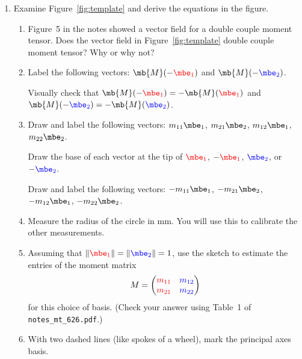 \documentclass[11pt,titlepage,fleqn]{article}
\newcommand{\mtfile}{\texttt{notes\_mt\_626.pdf}}
\newcommand{\eone}{\textcolor{red}{\mbe_1}}
\newcommand{\etwo}{\textcolor{blue}{\mbe_2}}
\begin{document}
\begin{enumerate}

\item Examine Figure~\ref{fig:template} and derive the equations in the figure.
\label{prob:bigvec}

\begin{enumerate}
\item Figure~5 in the notes showed a vector field for a double couple moment tensor. Does the vector field in Figure~\ref{fig:template} double couple moment tensor? Why or why not?

\item Label the following vectors: $\mb{M}(-\eone)$ and $\mb{M}(-\etwo)$.

Visually check that $\mb{M}(-\eone) = -\mb{M}(\eone)$ and $\mb{M}(-\etwo) = -\mb{M}(\etwo)$.

\item Draw and label the following vectors: \textcolor{red}{$m_{11}\mbe_1$}, \textcolor{red}{$m_{21}\mbe_2$}, \textcolor{blue}{$m_{12}\mbe_1$}, \textcolor{blue}{$m_{22}\mbe_2$}.

Draw the base of each vector at the tip of $\eone$, $-\eone$, $\etwo$, or $-\etwo$.

Draw and label the following vectors: \textcolor{red}{$-m_{11}\mbe_1$}, \textcolor{red}{$-m_{21}\mbe_2$}, \textcolor{blue}{$-m_{12}\mbe_1$}, \textcolor{blue}{$-m_{22}\mbe_2$}.

\item Measure the radius of the circle in mm. You will use this to calibrate the other measurements.

\item Assuming that $\|\eone\| = \|\etwo\| = 1$, use the sketch to estimate the entries of the moment matrix
%
\begin{equation*}
M = \begin{pmatrix} \textcolor{red}{m_{11}} & \textcolor{blue}{m_{12}} \\ \textcolor{red}{m_{21}} & \textcolor{blue}{m_{22}} \end{pmatrix}
\end{equation*}
%
for this choice of basis.
(Check your answer using Table~1 of \mtfile.)

\item With two dashed lines (like spokes of a wheel), mark the principal axes basis.

\end{enumerate}



\end{enumerate}
\end{document}
